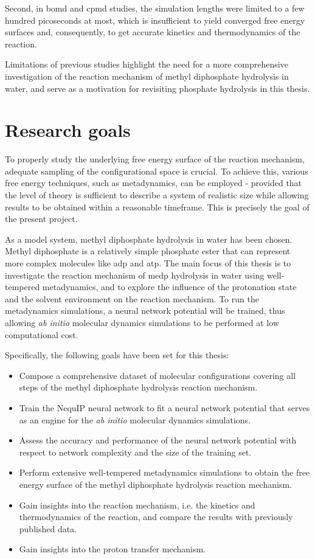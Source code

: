 Second, in \ac{bomd} and \ac{cpmd} studies, the simulation lengths were limited to a few hundred picoseconds at most, which is insufficient to yield converged free energy surfaces and, consequently, to get accurate kinetics and thermodynamics of the reaction.

Limitations of previous studies highlight the need for a more comprehensive investigation of the reaction mechanism of methyl diphosphate hydrolysis in water, and serve as a motivation for revisiting phosphate hydrolysis in this thesis.



\section{Research goals}

To properly study the underlying free energy surface of the reaction mechanism, adequate sampling of the configurational space is crucial. To achieve this, various free energy techniques, such as metadynamics, can be employed - provided that the level of theory is sufficient to describe a system of realistic size while allowing results to be obtained within a reasonable timeframe. This is precisely the goal of the present project.

As a model system, methyl diphosphate hydrolysis in water has been chosen. Methyl diphosphate is a relatively simple phosphate ester that can represent more complex molecules like \ac{adp} and \ac{atp}. The main focus of this thesis is to investigate the reaction mechanism of \ac{medp} hydrolysis in water using well-tempered metadynamics, and to explore the influence of the protonation state and the solvent environment on the reaction mechanism. To run the metadynamics simulations, a neural network potential will be trained, thus allowing \textit{ab initio} molecular dynamics simulations to be performed at low computational cost.

Specifically, the following goals have been set for this thesis:
\begin{itemize}
    \item Compose a comprehensive dataset of molecular configurations covering all steps of the methyl diphosphate hydrolysis reaction mechanism.
    \item Train the NequIP neural network to fit a neural network potential that serves as an engine for the \textit{ab initio} molecular dynamics simulations.
    \item Assess the accuracy and performance of the neural network potential with respect to network complexity and the size of the training set.
    \item Perform extensive well-tempered metadynamics simulations to obtain the free energy surface of the methyl diphosphate hydrolysis reaction mechanism.
    \item Gain insights into the reaction mechanism, i.e. the kinetics and thermodynamics of the reaction, and compare the results with previously published data.
    \item Gain insights into the proton transfer mechanism.
\end{itemize}

